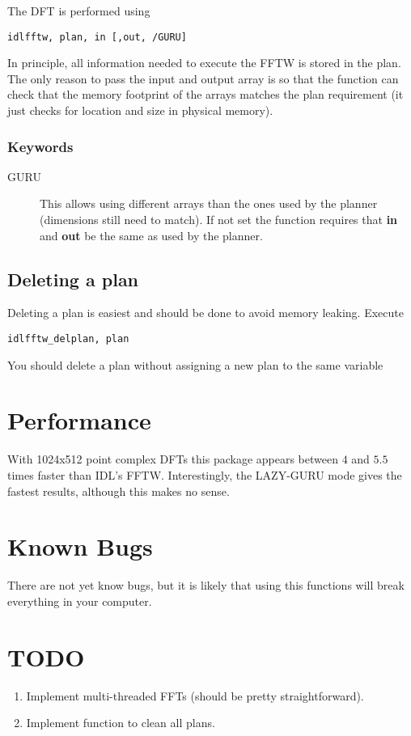 \documentclass[a4paper,11pt]{article}
\begin{document}
The DFT is performed using
\begin{verbatim}
idlfftw, plan, in [,out, /GURU]
\end{verbatim}
In principle, all information needed to execute the FFTW is stored in the plan. The only reason to pass the input and output array is so that the function can check that the memory footprint of the arrays matches the plan requirement (it just checks for location and size in physical memory).

\subsubsection*{Keywords}

\begin{description}
\item[GURU] This allows using different arrays than the ones used by the planner (dimensions still need to match). If not set the function requires that \textbf{in} and \textbf{out} be the same as used by the planner. 
\end{description}

\subsection{Deleting a plan}

Deleting a plan is easiest and should be done to avoid memory leaking. Execute
\begin{verbatim}
idlfftw_delplan, plan
\end{verbatim} 
You should delete a plan without assigning a new plan to the same variable

\section{Performance}

With 1024x512 point complex DFTs this package appears between $4$ and $5.5$ times faster than IDL's FFTW. Interestingly, the LAZY-GURU mode gives the fastest results, although this makes no sense.

\section{Known Bugs}

There are not yet know bugs, but it is likely that using this functions will break everything in your computer.

\section{TODO}

\begin{enumerate}
\item Implement multi-threaded FFTs (should be pretty straightforward).
\item Implement function to clean all plans.
\end{enumerate}
\end{document}
